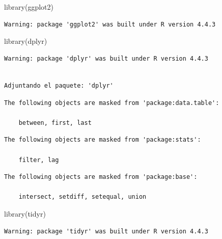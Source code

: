 \documentclass[
  letterpaper,
  DIV=11,
  numbers=noendperiod]{scrartcl}
\newenvironment{Shaded}{\begin{snugshade}}{\end{snugshade}}
\newcommand{\FunctionTok}[1]{\textcolor[rgb]{0.28,0.35,0.67}{#1}}
\newcommand{\NormalTok}[1]{\textcolor[rgb]{0.00,0.23,0.31}{#1}}
\begin{document}
\begin{Shaded}
\begin{Highlighting}[]
\FunctionTok{library}\NormalTok{(ggplot2)}
\end{Highlighting}
\end{Shaded}

\begin{verbatim}
Warning: package 'ggplot2' was built under R version 4.4.3
\end{verbatim}

\begin{Shaded}
\begin{Highlighting}[]
\FunctionTok{library}\NormalTok{(dplyr)}
\end{Highlighting}
\end{Shaded}

\begin{verbatim}
Warning: package 'dplyr' was built under R version 4.4.3
\end{verbatim}

\begin{verbatim}

Adjuntando el paquete: 'dplyr'
\end{verbatim}

\begin{verbatim}
The following objects are masked from 'package:data.table':

    between, first, last
\end{verbatim}

\begin{verbatim}
The following objects are masked from 'package:stats':

    filter, lag
\end{verbatim}

\begin{verbatim}
The following objects are masked from 'package:base':

    intersect, setdiff, setequal, union
\end{verbatim}

\begin{Shaded}
\begin{Highlighting}[]
\FunctionTok{library}\NormalTok{(tidyr)}
\end{Highlighting}
\end{Shaded}

\begin{verbatim}
Warning: package 'tidyr' was built under R version 4.4.3
\end{verbatim}
\end{document}
